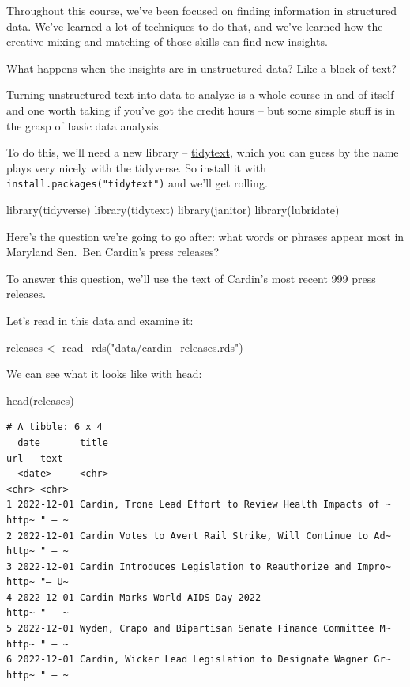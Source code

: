 \documentclass[
  letterpaper,
  DIV=11,
  numbers=noendperiod]{scrreprt}
\newenvironment{Shaded}{\begin{snugshade}}{\end{snugshade}}
\newcommand{\FunctionTok}[1]{\textcolor[rgb]{0.28,0.35,0.67}{#1}}
\newcommand{\NormalTok}[1]{\textcolor[rgb]{0.00,0.23,0.31}{#1}}
\newcommand{\OtherTok}[1]{\textcolor[rgb]{0.00,0.23,0.31}{#1}}
\newcommand{\StringTok}[1]{\textcolor[rgb]{0.13,0.47,0.30}{#1}}
\begin{document}
Throughout this course, we've been focused on finding information in
structured data. We've learned a lot of techniques to do that, and we've
learned how the creative mixing and matching of those skills can find
new insights.

What happens when the insights are in unstructured data? Like a block of
text?

Turning unstructured text into data to analyze is a whole course in and
of itself -- and one worth taking if you've got the credit hours -- but
some simple stuff is in the grasp of basic data analysis.

To do this, we'll need a new library --
\href{https://cran.r-project.org/web/packages/tidytext/vignettes/tidytext.html}{tidytext},
which you can guess by the name plays very nicely with the tidyverse. So
install it with \texttt{install.packages("tidytext")} and we'll get
rolling.

\begin{Shaded}
\begin{Highlighting}[]
\FunctionTok{library}\NormalTok{(tidyverse)}
\FunctionTok{library}\NormalTok{(tidytext)}
\FunctionTok{library}\NormalTok{(janitor)}
\FunctionTok{library}\NormalTok{(lubridate)}
\end{Highlighting}
\end{Shaded}

Here's the question we're going to go after: what words or phrases
appear most in Maryland Sen.~Ben Cardin's press releases?

To answer this question, we'll use the text of Cardin's most recent 999
press releases.

Let's read in this data and examine it:

\begin{Shaded}
\begin{Highlighting}[]
\NormalTok{releases }\OtherTok{\textless{}{-}} \FunctionTok{read\_rds}\NormalTok{(}\StringTok{"data/cardin\_releases.rds"}\NormalTok{)}
\end{Highlighting}
\end{Shaded}

We can see what it looks like with head:

\begin{Shaded}
\begin{Highlighting}[]
\FunctionTok{head}\NormalTok{(releases)}
\end{Highlighting}
\end{Shaded}

\begin{verbatim}
# A tibble: 6 x 4
  date       title                                                   url   text 
  <date>     <chr>                                                   <chr> <chr>
1 2022-12-01 Cardin, Trone Lead Effort to Review Health Impacts of ~ http~ " – ~
2 2022-12-01 Cardin Votes to Avert Rail Strike, Will Continue to Ad~ http~ " – ~
3 2022-12-01 Cardin Introduces Legislation to Reauthorize and Impro~ http~ "– U~
4 2022-12-01 Cardin Marks World AIDS Day 2022                        http~ " – ~
5 2022-12-01 Wyden, Crapo and Bipartisan Senate Finance Committee M~ http~ " – ~
6 2022-12-01 Cardin, Wicker Lead Legislation to Designate Wagner Gr~ http~ " – ~
\end{verbatim}
\end{document}
